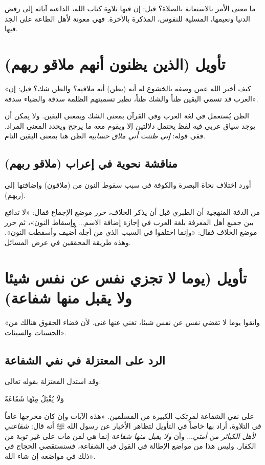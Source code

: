  ما معنى الأمر بالاستعانة بالصلاة؟ قيل: إن فيها تلاوة كتاب الله، الداعية آياته إلى رفض الدنيا ونعيمها، المسلية للنفوس، المذكرة بالآخرة. فهي معونة لأهل الطاعة على الجد فيها.

\separator

\section{تأويل (الذين يظنون أنهم ملاقو ربهم)}
 «كيف أخبر الله عمن وصفه بالخشوع له أنه (يظن) أنه ملاقيه؟ والظن شك؟ قيل: إن العرب قد تسمي اليقين ظناً والشك ظناً، نظير تسميتهم الظلمة سدفة والضياء سدفة».

\begin{fawaid}
الظن يُستعمل في لغة العرب وفي القرآن بمعنى الشك وبمعنى اليقين. ولا يمكن أن يوجد سياق عربي فيه لفظ يحتمل دلالتين إلا ويقوم معه ما يرجح ويحدد المعنى المراد. ففي قوله: \textit{إني ظننت أني ملاق حسابيه} الظن هنا بمعنى اليقين التام.
\end{fawaid}

\subsection{مناقشة نحوية في إعراب (ملاقو ربهم)}
أورد  اختلاف نحاة البصرة والكوفة في سبب سقوط النون من (ملاقون) وإضافتها إلى (ربهم). 
\begin{fawaid}
من الدقة المنهجية أن الطبري قبل أن يذكر الخلاف، حرر موضع الإجماع فقال: «لا تدافع بين جميع أهل المعرفة بلغة العرب في إجازة إضافة الاسم... وإسقاط النون»، ثم حرر موضع الخلاف فقال: «وإنما اختلفوا في السبب الذي من أجله أُضيف وأسقطت النون». وهذه طريقة المحققين في عرض المسائل.
\end{fawaid}

\separator

\section{تأويل (يوما لا تجزي نفس عن نفس شيئا ولا يقبل منها شفاعة)}
 «واتقوا يوما لا تقضي نفس عن نفس شيئا، تغني عنها غنى. لأن قضاء الحقوق هنالك من الحسنات والسيئات».

\subsection{الرد على المعتزلة في نفي الشفاعة}
وقد استدل المعتزلة بقوله تعالى: \begin{ayah}وَلَا يُقْبَلُ مِنْهَا شَفَاعَةٌ\end{ayah} على نفي الشفاعة لمرتكب الكبيرة من المسلمين.
 «هذه الآيات وإن كان مخرجها عاماً في التلاوة، أراد بها خاصاً في التأويل لتظاهر الأخبار عن رسول الله ﷺ أنه قال: \textit{شفاعتي لأهل الكبائر من أمتي}... وأن \textit{ولا يقبل منها شفاعة} إنما هي لمن مات على غير توبة من الكفار. وليس هذا من مواضع الإطالة في القول في الشفاعة، فسنستقصي الحجاج في ذلك في مواضعه إن شاء الله».

